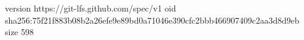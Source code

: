 version https://git-lfs.github.com/spec/v1
oid sha256:75f21f883b08b2a26efe9e89bd0a71046e390cfc2bbb466907409c2aa3d8d9eb
size 598
